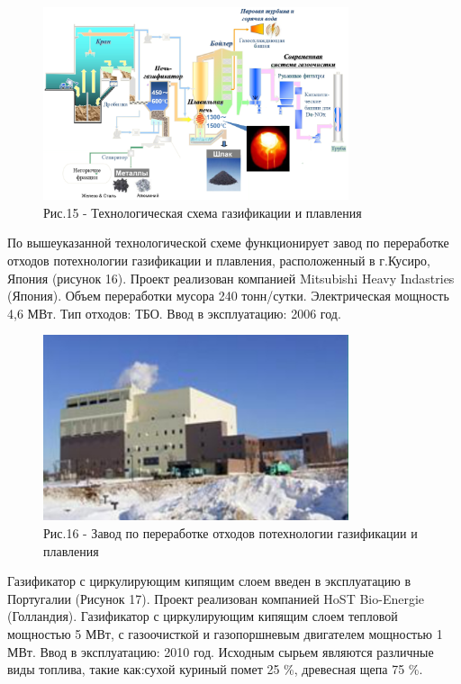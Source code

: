 \begin{figure}[H]
	\centering
	\includegraphics[width=0.8\textwidth]{media/chem2/image78}
	\caption*{Рис.15 - Технологическая схема газификации и плавления}
\end{figure}

По вышеуказанной технологической схеме функционирует завод по
переработке отходов потехнологии газификации и плавления, расположенный
в г.Кусиро, Япония (рисунок 16). Проект реализован компанией Mitsubishi
Heavy Indastries (Япония). Объем переработки мусора 240 тонн/сутки.
Электрическая мощность 4,6 МВт. Тип отходов: ТБО. Ввод в эксплуатацию:
2006 год.

\begin{figure}[H]
	\centering
	\includegraphics[width=0.8\textwidth]{media/chem2/image79}
	\caption*{Рис.16 - Завод по переработке отходов потехнологии газификации и плавления}
\end{figure}

Газификатор с циркулирующим кипящим слоем введен в эксплуатацию в
Португалии (Рисунок 17). Проект реализован компанией HoST Bio-Energie
(Голландия). Газификатор с циркулирующим кипящим слоем тепловой
мощностью 5 МВт, с газоочисткой и газопоршневым двигателем мощностью 1
МВт. Ввод в эксплуатацию: 2010 год. Исходным сырьем являются различные
виды топлива, такие как:сухой куриный помет 25 \%, древесная щепа 75 \%.

